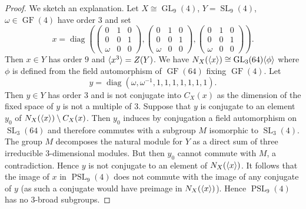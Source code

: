 \documentclass[12pt,a4paper]{amsart}
\DeclareMathOperator{\GL}{GL}
\DeclareMathOperator{\PSL}{PSL}
\DeclareMathOperator{\SL}{SL}
\DeclareMathOperator{\diag}{diag}
\DeclareMathOperator{\GF}{GF}
\DeclarePairedDelimiter{\gen}{\langle}{\rangle}
\begin{document}
\begin{proof} We sketch an explanation.
Let $X\cong \GL_9(4)$, $Y= \SL_9(4)$, $\omega \in \GF(4)$ have order $3$ and set  $$x=\diag(\left(\begin{smallmatrix} 0&1&0\\0&0&1\\\omega&0&0\end{smallmatrix}\right), \left(\begin{smallmatrix} 0&1&0\\0&0&1\\\omega&0&0\end{smallmatrix}\right),\left(\begin{smallmatrix} 0&1&0\\0&0&1\\\omega&0&0\end{smallmatrix}\right)).$$
Then $x\in Y$  has order $9$ and $\gen{x^3}= Z(Y)$.
We have $N_X(\gen{x}) \cong \GL_3(64)\gen{\phi}$ where $\phi$ is defined from the field automorphism of $\GF(64)$ fixing $\GF(4)$. Let $$y=\diag(\omega, \omega^{-1},1,1,1,1,1,1,1).$$ Then $y\in Y$ has order $3$ and is not conjugate into $C_X(x)$ as the dimension of the fixed space of $y$ is not a multiple of $3$. Suppose that $y$ is conjugate to an element $y_0$ of $N_X(\gen x)\setminus C_X(x)$. Then $y_0$ induces by conjugation a field automorphism on $\SL_3(64)$ and therefore commutes with a subgroup $M$ isomorphic to $\SL_3(4)$. The group $M$ decomposes the natural module for $Y$ as a direct sum of three irreducible $3$-dimensional modules. But then $y_0$ cannot commute with $M$, a contradiction. Hence $y$ is not conjugate to an element of $N_X(\gen{x})$. It follows that the image  of $x$ in $\PSL_9(4)$ does not commute with the image of any conjugate of $y$ (as such a conjugate would have preimage in $N_X (\gen{x})$). Hence $\PSL_9(4)$ has no $3$-broad subgroups.
\end{proof}
\end{document}

